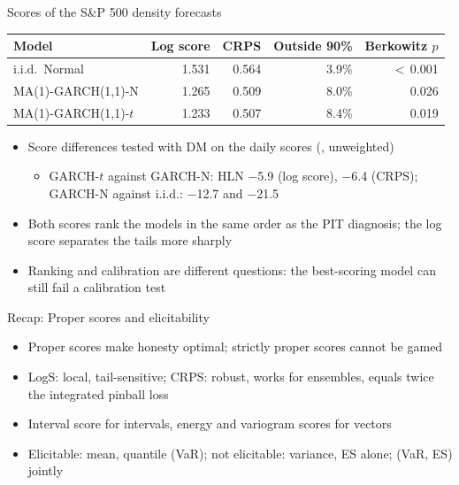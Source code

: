 \begin{frame}{Scores of the S\&P 500 density forecasts}
\itemsize{\footnotesize}
\begin{center}
\footnotesize
\begin{tabular}{lrrrr}
\toprule
\textbf{Model} & \textbf{Log score} & \textbf{CRPS} & \textbf{Outside 90\%} & \textbf{Berkowitz $p$} \\
\midrule
i.i.d.\ Normal & 1.531 & 0.564 & 3.9\% & $<$\,0.001 \\
MA(1)-GARCH(1,1)-N & 1.265 & 0.509 & 8.0\% & 0.026 \\
MA(1)-GARCH(1,1)-$t$ & 1.233 & 0.507 & 8.4\% & 0.019 \\
\bottomrule
\end{tabular}
\end{center}
\begin{itemize}
    \item Score differences tested with DM on the daily scores (, unweighted)
    \begin{itemize}
        \item GARCH-$t$ against GARCH-N: HLN \ensuremath{-}5.9 (log score), \ensuremath{-}6.4 (CRPS); GARCH-N against i.i.d.: \ensuremath{-}12.7 and \ensuremath{-}21.5
    \end{itemize}
    \item Both scores rank the models in the same order as the PIT diagnosis; the log score separates the tails more sharply
    \item Ranking and calibration are different questions: the best-scoring model can still fail a calibration test
\end{itemize}
\end{frame}

\begin{frame}{Recap: Proper scores and elicitability}
\itemsize{\small}
\begin{itemize}
    \item Proper scores make honesty optimal; strictly proper scores cannot be gamed
    \item LogS: local, tail-sensitive; CRPS: robust, works for ensembles, equals twice the integrated pinball loss
    \item Interval score for intervals, energy and variogram scores for vectors
    \item Elicitable: mean, quantile (VaR); not elicitable: variance, ES alone; (VaR, ES) jointly
\end{itemize}
\end{frame}


